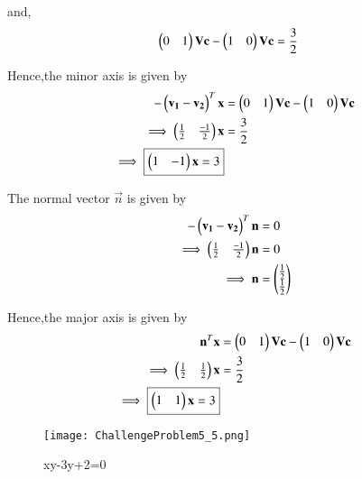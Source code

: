 \documentclass[journal,12pt,twocolumn]{IEEEtran}
\begin{document}
\begin{enumerate}
    and,
    \begin{align}
    \begin{pmatrix}0 & 1\end{pmatrix}\mathbf{V}\mathbf{c} - \begin{pmatrix}1&0\end{pmatrix}\mathbf{V}\mathbf{c} &= \frac{3}{2}
    \end{align}

    Hence,the minor axis is given by
    \begin{align}
    -\begin{pmatrix}\mathbf{v_1}-\mathbf{v_2}\end{pmatrix}^T\mathbf{x} &= \begin{pmatrix}0 & 1\end{pmatrix}\mathbf{V}\mathbf{c} - \begin{pmatrix}1 & 0\end{pmatrix}\mathbf{V}\mathbf{c} \\
    \implies \begin{pmatrix}\frac{1}{2} & \frac{-1}{2}\end{pmatrix}\mathbf{x} &= \frac{3}{2} \\
    \implies \boxed{\begin{pmatrix}1 & -1\end{pmatrix}\mathbf{x} = 3}
    \end{align}
    
    The normal vector $\vec{n}$ is given by
    \begin{align}
        -\begin{pmatrix}\mathbf{v_1}-\mathbf{v_2}\end{pmatrix}^T\mathbf{n} &= 0
        \\
        \implies \begin{pmatrix}\frac{1}{2} & \frac{-1}{2}\end{pmatrix}\mathbf{n} &= 0
        \\
        \implies \mathbf{n} &= \begin{pmatrix}\frac{1}{2} \\ \frac{1}{2}\end{pmatrix}
    \end{align}
    
    Hence,the major axis is given by
    \begin{align}
        \mathbf{n}^T\mathbf{x} &= \begin{pmatrix}0 & 1\end{pmatrix}\mathbf{V}\mathbf{c} - \begin{pmatrix}1 & 0\end{pmatrix}\mathbf{V}\mathbf{c} 
        \\
        \implies \begin{pmatrix}\frac{1}{2} & \frac{1}{2}\end{pmatrix}\mathbf{x} &= \frac{3}{2}
        \\
        \implies \boxed{\begin{pmatrix}1 & 1\end{pmatrix}\mathbf{x} = 3}
    \end{align}
    
    \begin{figure}[!ht]
    \centering
    \texttt{[image: ChallengeProblem5\_5.png]}
    \caption{xy-3y+2=0}
    \label{ex5}	
    \end{figure}
    
\end{enumerate}
\end{document}
